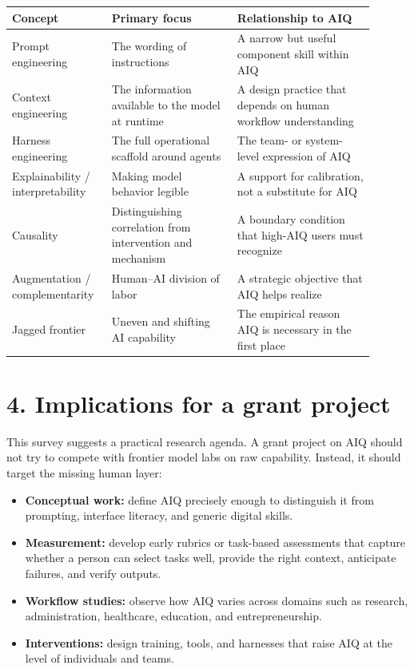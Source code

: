 \documentclass[10pt]{article}
\begin{document}
\begin{center}
\begin{tabular}{>{\raggedright\arraybackslash}p{0.23\linewidth} >{\raggedright\arraybackslash}p{0.32\linewidth} >{\raggedright\arraybackslash}p{0.35\linewidth}}
\textbf{Concept} & \textbf{Primary focus} & \textbf{Relationship to AIQ} \\
\hline
Prompt engineering & The wording of instructions & A narrow but useful component skill within AIQ \\
Context engineering & The information available to the model at runtime & A design practice that depends on human workflow understanding \\
Harness engineering & The full operational scaffold around agents & The team- or system-level expression of AIQ \\
Explainability / interpretability & Making model behavior legible & A support for calibration, not a substitute for AIQ \\
Causality & Distinguishing correlation from intervention and mechanism & A boundary condition that high-AIQ users must recognize \\
Augmentation / complementarity & Human--AI division of labor & A strategic objective that AIQ helps realize \\
Jagged frontier & Uneven and shifting AI capability & The empirical reason AIQ is necessary in the first place \\
\end{tabular}
\end{center}

\section*{4. Implications for a grant project}

This survey suggests a practical research agenda. A grant project on AIQ should not try to compete with frontier model labs on raw capability. Instead, it should target the missing human layer:

\begin{itemize}
\item \textbf{Conceptual work:} define AIQ precisely enough to distinguish it from prompting, interface literacy, and generic digital skills.
\item \textbf{Measurement:} develop early rubrics or task-based assessments that capture whether a person can select tasks well, provide the right context, anticipate failures, and verify outputs.
\item \textbf{Workflow studies:} observe how AIQ varies across domains such as research, administration, healthcare, education, and entrepreneurship.
\item \textbf{Interventions:} design training, tools, and harnesses that raise AIQ at the level of individuals and teams.
\end{itemize}
\end{document}
